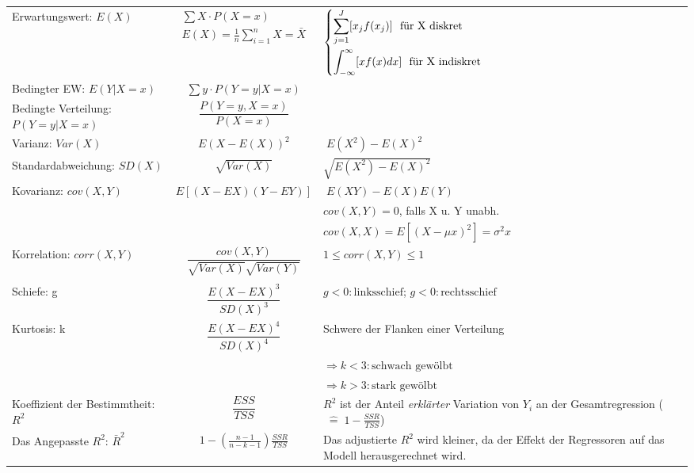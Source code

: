 \begin{longtabu}to
	Erwartungswert: $E(X)$ &%
	\parbox[c]{0.5\textwidth}{
		\begin{align*}
				\sum X\cdot P(X=x)\\
				E(X)=\frac{1}{n}\sum^{n}_{i=1} X=\bar X
		\end{align*}
	}
	&$\begin{dcases}
		\sum^{J}_{j=1}\lbrack x_jf(x_j)\rbrack\text{~~für X diskret}\\
		\int^{\infty}_{-\infty}\lbrack xf(x)dx\rbrack\text{~~für X indiskret}
	\end{dcases}$\\
	Bedingter EW: $E(Y|X=x)$ &$\sum y\cdot P(Y=y|X=x)$\\
	Bedingte Verteilung: $P(Y=y|X=x)$ &$\dfrac{P(Y=y, X=x)}{P(X=x)}$\\
	Varianz: $Var(X)$ & $E\left(X-E(X)\right)^2$ & $\; E(X^2)-E(X)^2$ \\
	Standardabweichung: $SD(X)$&$\sqrt{Var(X)}$&$\sqrt{E(X^2)-E(X)^2}$\\
	Kovarianz:%
	$cov(X,Y)$ & $E \left[ (X-EX)(Y-EY)\right] $&$ \; E(XY) - E(X)E(Y)$\\
					 && $cov(X,Y)=0$, falls X u. Y unabh.\\
			   && $cov(X,X)=E[(X-\mu x)^2]=\sigma^2x$ \\%
	Korrelation: $corr(X,Y)$  &%
	$\dfrac{cov(X,Y)}{\sqrt{Var(X)}\sqrt{Var(Y)}}$ & $1\leq corr(X,Y)\leq
				1$\\\\%
	Schiefe: g & $\dfrac{E(X-EX)^3}{SD(X)^3}$&$g < 0: \text{linksschief}$; $g < 0: \text{rechtsschief}$\\%
	Kurtosis: k  %
	& $\dfrac{E(X-EX)^4}{SD(X)^4}$ & Schwere der Flanken einer Verteilung\\
	&&$\Rightarrow k < 3: \text{schwach gewölbt}$\\
	&&$\Rightarrow k > 3: \text{stark gewölbt}$\\%
	Koeffizient der Bestimmtheit: $R^2$%
	\label{formula:R2}
	&$\dfrac{ESS}{TSS}$
	&$R^2$ ist der Anteil \emph{erklärter} Variation von $Y_i$ an der Gesamtregression ($\;\hat{=}\;1-\frac{SSR}{TSS}$)\\%
	Das Angepasste $R^2$: $\bar{R}^2$&$1-\left( \frac{n-1}{n-k-1}\right)\frac{SSR}{TSS}$&Das \frqq adjustierte\flqq{} $R^2$ wird
	kleiner, da der Effekt der Regressoren auf das Modell herausgerechnet wird.\\

\end{longtabu}
